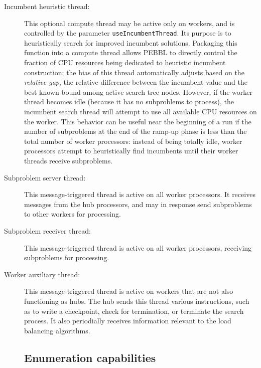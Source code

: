 \begin{description}
\item[Incumbent heuristic thread:] This optional compute thread may be
  active only on workers, and is controlled by the parameter
  \texttt{useIncumbentThread}.  Its purpose is to heuristically search
  for improved incumbent solutions.  Packaging this function into a
  compute thread allows PEBBL to directly control the fraction of CPU
  resources being dedicated to heuristic incumbent construction; the
  bias of this thread automatically adjusts based on the \emph{relative
  gap}, the relative difference between the incumbent value
  and the best known bound among active search tree nodes.  However,
  if the worker thread becomes idle (because it has no subproblems to
  process), the incumbent search thread will attempt to use all
  available CPU resources on the worker.  This behavior can be useful
  near the beginning of a run if the number of subproblems at the end of
  the ramp-up phase is less than the total number of worker
  processors: instead of being totally idle, worker
  processors attempt to heuristically find incumbents until their
  worker threads receive subproblems.

\item[Subproblem server thread:] This message-triggered thread is
  active on all worker processors.  It receives messages from the hub
  processors, and may in response send subproblems to other workers
  for processing.

\item[Subproblem receiver thread:]  This message-triggered thread is
  active on all worker processors, receiving subproblems for processing.

\item[Worker auxiliary thread:]  This message-triggered thread is
  active on workers that are not also functioning as hubs.  The hub
  sends this thread various instructions, such as to write a
  checkpoint, check for termination, or terminate the search process.
  It also periodially receives information relevant to the load
  balancing algorithms.


\subsection{Enumeration capabilities}


\end{description}
